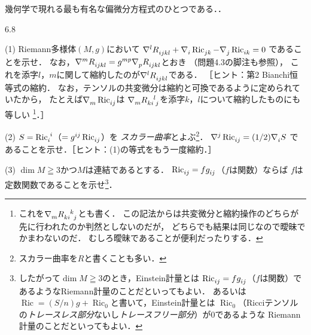 \documentclass[uplatex,dvipdfmx,fontsize=12pt,jafontsize=11pt,line_length=42zw,number_of_lines=36,hanging_punctuation]{jlreq}
\DeclareMathOperator{\Ric}{Ric}
\begin{document}
\begin{problems}
\begin{subproblems}
{				幾何学で現れる最も有名な偏微分方程式のひとつである．}．
		\end{subproblems}
	\item[6.8]\phantom{}
		\begin{subproblems}
			\item[(1)]\vspace{-\baselineskip}
				Riemann多様体$(M,g)$において
				$\tensor{\nabla}{^l}\tensor{R}{_i_j_k_l}
				+\tensor{\nabla}{_i}\tensor{\Ric}{_j_k}
				-\tensor{\nabla}{_j}\tensor{\Ric}{_i_k}=0$
				であることを示せ．
				なお，$\tensor{\nabla}{^m}\tensor{R}{_i_j_k_l}
				=\tensor{g}{^m^p}\tensor{\nabla}{_p}\tensor{R}{_i_j_k_l}$とおき
				（問題4.3の脚注も参照），
				これを添字$l$，$m$に関して縮約したのが$\tensor{\nabla}{^l}\tensor{R}{_i_j_k_l}$である．
				［ヒント：第2 Bianchi恒等式の縮約．
				なお，テンソルの共変微分は縮約と可換であるように定められていたから，
				たとえば$\tensor{\nabla}{_m}\tensor{\Ric}{_i_j}$は
				$\tensor{\nabla}{_m}\tensor{R}{_k_i^l_j}$を添字$k$，$l$について縮約したものにも等しい
				\footnote{これを$\tensor{\nabla}{_m}\tensor{R}{_k_i^k_j}$とも書く．
				この記法からは共変微分と縮約操作のどちらが先に行われたのか判然としないのだが，
				どちらでも結果は同じなので曖昧でかまわないのだ．
				むしろ曖昧であることが便利だったりする．}．］
			\item[(2)]
				$S=\tensor{\Ric}{_i^i}$（$=\tensor{g}{^i^j}\tensor{\Ric}{_i_j}$）を
				\emph{スカラー曲率}とよぶ\footnote{スカラー曲率を$R$と書くことも多い．}．
				$\tensor{\nabla}{^j}\tensor{\Ric}{_i_j}=(1/2)\tensor{\nabla}{_i}S$
				であることを示せ．［ヒント：(1)の等式をもう一度縮約．］
			\item[(3)]
				$\dim M\geqq 3$かつ$M$は連結であるとする．
				$\tensor{\Ric}{_i_j}=f\tensor{g}{_i_j}$（$f$は関数）ならば
				$f$は定数関数であることを示せ\footnote{したがって$\dim M\geqq 3$のとき，Einstein計量とは
				$\tensor{\Ric}{_i_j}=f\tensor{g}{_i_j}$（$f$は関数）であるようなRiemann計量のことだといってもよい．
				あるいは$\Ric=(S/n)g+\Ric_0$と書いて，Einstein計量とは
				$\Ric_0$（Ricciテンソルの\emph{トレースレス部分}ないし\emph{トレースフリー部分}）が$0$であるような
				Riemann計量のことだといってもよい．}．
		\end{subproblems}
\end{problems}
\end{document}
